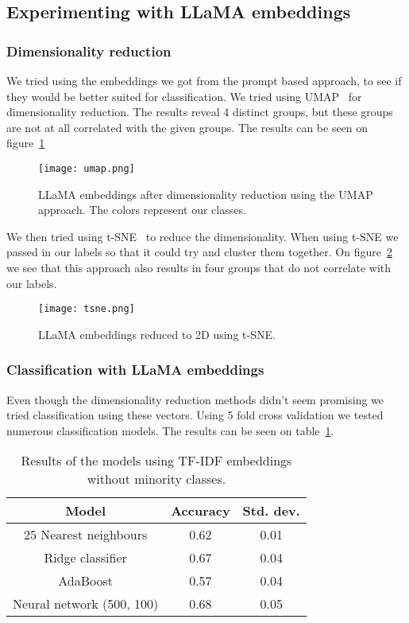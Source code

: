 \documentclass[fleqn,moreauthors,10pt]{ds_report}
\begin{document}
\subsection{Experimenting with LLaMA embeddings}
\subsubsection{Dimensionality reduction}
We tried using the embeddings we got from the prompt based approach, to
see if they would be better suited for classification. We tried
using UMAP~\cite{umap} for dimensionality reduction. The results
reveal 4 distinct groups, but these groups are not at all correlated
with the given groups. The results can be seen on figure~\ref{fig:umap}

\begin{figure}[h]
    \centering
    \texttt{[image: umap.png]}
    \caption{LLaMA embeddings after dimensionality reduction using the UMAP approach. The colors represent our classes.}
    \label{fig:umap}
\end{figure}

We then tried using t-SNE~\cite{tsne} to reduce the dimensionality.
When using t-SNE we passed in our labels so that it could try and
cluster them together. On figure~\ref{fig:tsne} we see that this approach
also results in four groups that do not correlate with our labels.

\begin{figure}[h]
    \centering
    \texttt{[image: tsne.png]}
    \caption{LLaMA embeddings reduced to 2D using t-SNE.}
    \label{fig:tsne}
\end{figure}

\subsubsection{Classification with LLaMA embeddings}

Even though the dimensionality reduction methods didn't seem promising
we tried classification using these vectors. Using 5 fold cross
validation we tested numerous classification models. The results
can be seen on table~\ref{tab:llama}.

\begin{table}[h]
    \centering
    \begin{tabular}{|c|c|c|}
    \hline
    \textbf{Model} & \textbf{Accuracy} & \textbf{Std. dev.} \\ \hline
    25 Nearest neighbours & 0.62 & 0.01 \\ \hline
    Ridge classifier & 0.67 & 0.04 \\ \hline
    AdaBoost & 0.57 & 0.04 \\ \hline
    Neural network (500, 100) & 0.68 & 0.05 \\ \hline
    \end{tabular}

    \caption{Results of the models using TF-IDF embeddings without minority classes.}
    \label{tab:llama}
\end{table}
\end{document}
